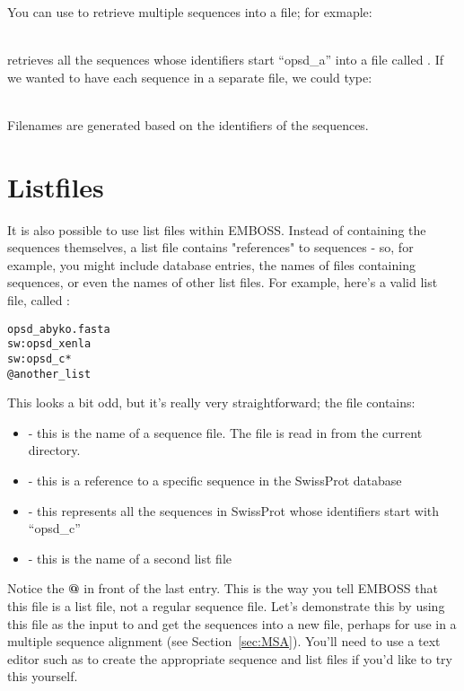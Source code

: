 \documentclass[12pt]{report}
\begin{document}
You can	use  to retrieve multiple sequences into a	file; for exmaple:

\unix{}\\

retrieves all the sequences whose identifiers start ``opsd\_a''	into a
file called . If we wanted to have each sequence in a
separate file, we could	type:

\unix{}\\

Filenames are generated	based on the identifiers of the	sequences.

\section{Listfiles}
It is also possible to use list	files within EMBOSS. Instead of
containing the sequences themselves, a list file contains
"references" to	sequences - so,	for example, you might include
database entries, the names of files containing	sequences, or even the
names of other list files. For example,	here's a valid list file,
called :

\unix{}
\begin{verbatim}
opsd_abyko.fasta
sw:opsd_xenla
sw:opsd_c*
@another_list
\end{verbatim}

This looks a bit odd, but it's really very straightforward; the	file contains:
\begin{itemize}
\item {} -	this is	the name of a sequence file. The file is read in from the current directory.
\item {} - this is a reference to a specific sequence	in the SwissProt database
\item {}	- this represents all the sequences in SwissProt whose identifiers start with ``opsd\_c''
\item {} - this is the	name of	a second list file
\end{itemize}

Notice the {\bf	@} in front of the last	entry. This is the way you
tell EMBOSS that this file is a	list file, not a regular sequence
file. Let's demonstrate	this by	using this file	as the input to
 and get the sequences into a new file, perhaps
for use	in a multiple sequence alignment (see Section~\ref{sec:MSA}). You'll
need to	use a text editor such as  to create	the appropriate
sequence and list files	if you'd like to try this yourself.
\end{document}
